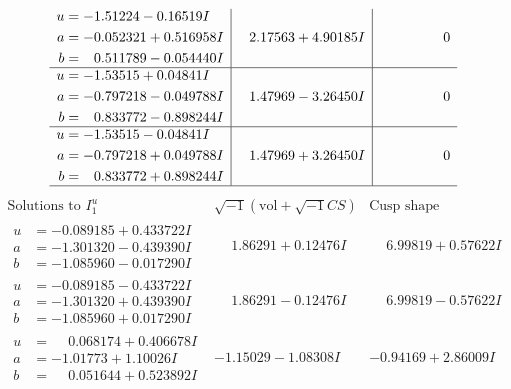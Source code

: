 \documentclass[1p]{elsarticle_modified}
\theoremstyle{definition}
\newcommand{\I}{\sqrt{-1}}
\begin{document}
$$\begin{array}{c|c|c}
\begin{aligned}
u &= -1.51224 - 0.16519 I \\
a &= -0.052321 + 0.516958 I \\
b &= \phantom{-}0.511789 - 0.054440 I\end{aligned}
 & \phantom{-}2.17563 + 4.90185 I & \phantom{-0.000000 } 0 \\ \hline\begin{aligned}
u &= -1.53515 + 0.04841 I \\
a &= -0.797218 - 0.049788 I \\
b &= \phantom{-}0.833772 - 0.898244 I\end{aligned}
 & \phantom{-}1.47969 - 3.26450 I & \phantom{-0.000000 } 0 \\ \hline\begin{aligned}
u &= -1.53515 - 0.04841 I \\
a &= -0.797218 + 0.049788 I \\
b &= \phantom{-}0.833772 + 0.898244 I\end{aligned}
 & \phantom{-}1.47969 + 3.26450 I & \phantom{-0.000000 } 0\\
 \hline 
 \end{array}$$\newpage$$\begin{array}{c|c|c}  
\text{Solutions to }I^u_{1}& \I (\text{vol} + \sqrt{-1}CS) & \text{Cusp shape}\\
 \hline 
\begin{aligned}
u &= -0.089185 + 0.433722 I \\
a &= -1.301320 - 0.439390 I \\
b &= -1.085960 - 0.017290 I\end{aligned}
 & \phantom{-}1.86291 + 0.12476 I & \phantom{-}6.99819 + 0.57622 I \\ \hline\begin{aligned}
u &= -0.089185 - 0.433722 I \\
a &= -1.301320 + 0.439390 I \\
b &= -1.085960 + 0.017290 I\end{aligned}
 & \phantom{-}1.86291 - 0.12476 I & \phantom{-}6.99819 - 0.57622 I \\ \hline\begin{aligned}
u &= \phantom{-}0.068174 + 0.406678 I \\
a &= -1.01773 + 1.10026 I \\
b &= \phantom{-}0.051644 + 0.523892 I\end{aligned}
 & -1.15029 - 1.08308 I & -0.94169 + 2.86009 I \\ \hline\begin{aligned}

\end{aligned}
\end{array}$$
\end{document}
